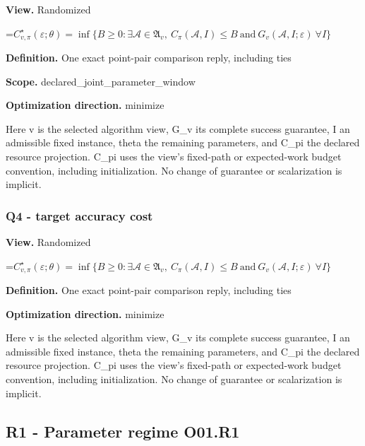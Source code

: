 \documentclass[10pt,a4paper]{article}
\newcommand{\AtlasMath}[1]{\par\begingroup\centering\setbox0=\hbox{$\displaystyle #1$}\ifdim\wd0>1.4\linewidth\typeout{ATLAS WIDE FORMULA: \the\wd0}\fi\ifdim\wd0>\linewidth\resizebox{\linewidth}{!}{\box0}\else\box0\fi\par\endgroup}
\begin{document}
\textbf{View.} Randomized



\AtlasMath{C^\star_{v,\pi}(\varepsilon;\theta)=\inf\{B\ge0:\exists\mathcal A\in\mathfrak A_v,\ C_\pi(\mathcal A,I)\le B\ \text{and}\ G_v(\mathcal A,I;\varepsilon)\ \forall I\}}


\textbf{Definition.} One exact point-pair comparison reply, including ties



\textbf{Scope.} declared\_joint\_parameter\_window



\textbf{Optimization direction.} minimize



Here v is the selected algorithm view, G\_v its complete success guarantee, I an admissible fixed instance, theta the remaining parameters, and C\_pi the declared resource projection. C\_pi uses the view's fixed-path or expected-work budget convention, including initialization. No change of guarantee or scalarization is implicit.



\subsubsection{Q4 - target accuracy cost}


\textbf{View.} Randomized



\AtlasMath{C^\star_{v,\pi}(\varepsilon;\theta)=\inf\{B\ge0:\exists\mathcal A\in\mathfrak A_v,\ C_\pi(\mathcal A,I)\le B\ \text{and}\ G_v(\mathcal A,I;\varepsilon)\ \forall I\}}


\textbf{Definition.} One exact point-pair comparison reply, including ties



\textbf{Optimization direction.} minimize



Here v is the selected algorithm view, G\_v its complete success guarantee, I an admissible fixed instance, theta the remaining parameters, and C\_pi the declared resource projection. C\_pi uses the view's fixed-path or expected-work budget convention, including initialization. No change of guarantee or scalarization is implicit.



\subsection{R1 - Parameter regime O01.R1}
\end{document}
